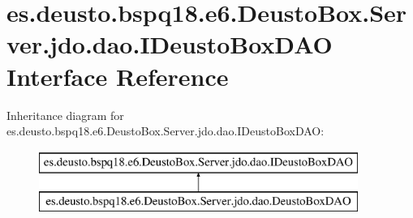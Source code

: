 \hypertarget{interfacees_1_1deusto_1_1bspq18_1_1e6_1_1_deusto_box_1_1_server_1_1jdo_1_1dao_1_1_i_deusto_box_d_a_o}{}\section{es.\+deusto.\+bspq18.\+e6.\+Deusto\+Box.\+Server.\+jdo.\+dao.\+I\+Deusto\+Box\+D\+AO Interface Reference}
\label{interfacees_1_1deusto_1_1bspq18_1_1e6_1_1_deusto_box_1_1_server_1_1jdo_1_1dao_1_1_i_deusto_box_d_a_o}
Inheritance diagram for es.\+deusto.\+bspq18.\+e6.\+Deusto\+Box.\+Server.\+jdo.\+dao.\+I\+Deusto\+Box\+D\+AO\+:\begin{figure}[H]
\begin{center}
\leavevmode
\includegraphics[height=2.000000cm]{interfacees_1_1deusto_1_1bspq18_1_1e6_1_1_deusto_box_1_1_server_1_1jdo_1_1dao_1_1_i_deusto_box_d_a_o}
\end{center}
\end{figure}
